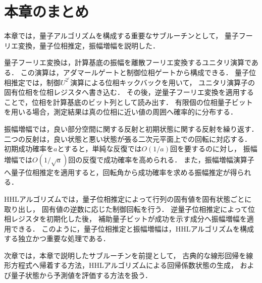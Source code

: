 \section{本章のまとめ}
\label{sec:quantum-subroutines-summary}

本章では，量子アルゴリズムを構成する重要なサブルーチンとして，
量子フーリエ変換，量子位相推定，振幅増幅を説明した．

量子フーリエ変換は，計算基底の振幅を離散フーリエ変換するユニタリ演算である．
この演算は，アダマールゲートと制御位相ゲートから構成できる．
量子位相推定では，制御$U^{2^r}$演算による位相キックバックを用いて，
ユニタリ演算子の固有位相を位相レジスタへ書き込む．
その後，逆量子フーリエ変換を適用することで，位相を計算基底のビット列として読み出す．
有限個の位相量子ビットを用いる場合，測定結果は真の位相に近い値の周囲へ確率的に分布する．

振幅増幅では，良い部分空間に関する反射と初期状態に関する反射を繰り返す．
二つの反射は，良い状態と悪い状態が張る二次元平面上での回転に対応する．
初期成功確率を$a$とすると，単純な反復では$O(1/a)$回を要するのに対し，
振幅増幅では$O(1/\sqrt{a})$回の反復で成功確率を高められる．
また，振幅増幅演算子へ量子位相推定を適用すると，回転角から成功確率を求める振幅推定が得られる．

HHLアルゴリズムでは，量子位相推定によって行列の固有値を固有状態ごとに取り出し，
固有値の逆数に応じた制御回転を行う．
逆量子位相推定によって位相レジスタを初期化した後，
補助量子ビットが成功を示す成分へ振幅増幅を適用できる．
このように，量子位相推定と振幅増幅は，HHLアルゴリズムを構成する独立かつ重要な処理である．

次章では，本章で説明したサブルーチンを前提として，
古典的な線形回帰を線形方程式へ帰着する方法，HHLアルゴリズムによる回帰係数状態の生成，
および量子状態から予測値を評価する方法を扱う．

